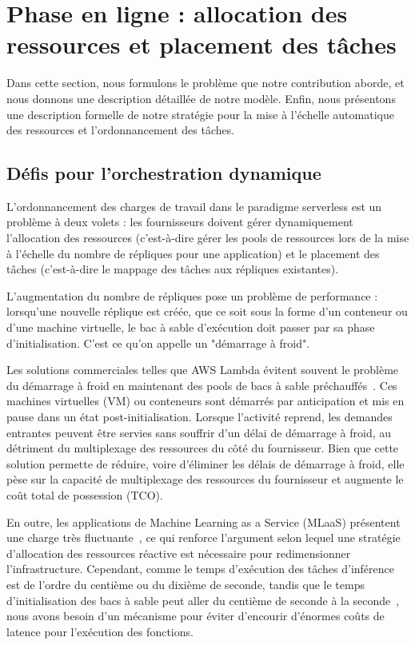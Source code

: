 \section{Phase en ligne : allocation des ressources et placement des tâches}
\label{section:herofake-online}

Dans cette section, nous formulons le problème que notre contribution aborde, et nous donnons une description détaillée de notre modèle. Enfin, nous présentons une description formelle de notre stratégie pour la mise à l'échelle automatique des ressources et l'ordonnancement des tâches. 

\subsection{Défis pour l'orchestration dynamique}

L'ordonnancement des charges de travail dans le paradigme serverless est un problème à deux volets : les fournisseurs doivent gérer dynamiquement l'allocation des ressources (c'est-à-dire gérer les pools de ressources lors de la mise à l'échelle du nombre de répliques pour une application) et le placement des tâches (c'est-à-dire le mappage des tâches aux répliques existantes).

L'augmentation du nombre de répliques pose un problème de performance : lorsqu'une nouvelle réplique est créée, que ce soit sous la forme d'un conteneur ou d'une machine virtuelle, le bac à sable d'exécution doit passer par sa phase d'initialisation. C'est ce qu'on appelle un "démarrage à froid".

Les solutions commerciales telles que AWS Lambda évitent souvent le problème du démarrage à froid en maintenant des pools de bacs à sable préchauffés~\cite{vahidiniaColdStartServerless2020}. Ces machines virtuelles (VM) ou conteneurs sont démarrés par anticipation et mis en pause dans un état post-initialisation. Lorsque l'activité reprend, les demandes entrantes peuvent être servies sans souffrir d'un délai de démarrage à froid, au détriment du multiplexage des ressources du côté du fournisseur. Bien que cette solution permette de réduire, voire d'éliminer les délais de démarrage à froid, elle pèse sur la capacité de multiplexage des ressources du fournisseur et augmente le coût total de possession (TCO).

En outre, les applications de Machine Learning as a Service (MLaaS) présentent une charge très fluctuante~\cite{gujaratiSwayamDistributedAutoscaling2017}, ce qui renforce l'argument selon lequel une stratégie d'allocation des ressources réactive est nécessaire pour redimensionner l'infrastructure. Cependant, comme le temps d'exécution des tâches d'inférence est de l'ordre du centième ou du dixième de seconde, tandis que le temps d'initialisation des bacs à sable peut aller du centième de seconde à la seconde~\cite{mancoMyVMLighter2017}, nous avons besoin d'un mécanisme pour éviter d'encourir d'énormes coûts de latence pour l'exécution des fonctions.


